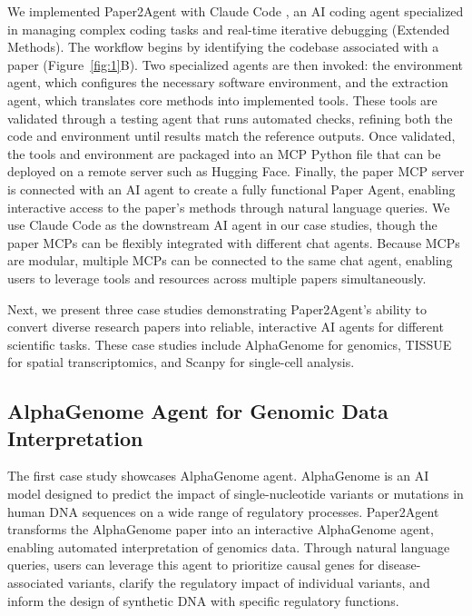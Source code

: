 \documentclass[11pt]{article}
\begin{document}
We implemented Paper2Agent with Claude Code \citep{anthropic_claude_code}, an AI coding agent specialized in managing complex coding tasks and real-time iterative debugging (Extended Methods). The workflow begins by identifying the codebase associated with a paper (Figure~\ref{fig:1}B). Two specialized agents are then invoked: the environment agent, which configures the necessary software environment, and the extraction agent, which translates core methods into implemented tools. These tools are validated through a testing agent that runs automated checks, refining both the code and environment until results match the reference outputs. Once validated, the tools and environment are packaged into an MCP Python file that can be deployed on a remote server such as Hugging Face. Finally, the paper MCP server is connected with an AI agent to create a fully functional Paper Agent, enabling interactive access to the paper’s methods through natural language queries. We use Claude Code as the downstream AI agent in our case studies, though the paper MCPs can be flexibly integrated with different chat agents. Because MCPs are modular, multiple MCPs can be connected to the same chat agent, enabling users to leverage tools and resources across multiple papers simultaneously.

Next, we present three case studies demonstrating Paper2Agent’s ability to convert diverse research papers into reliable, interactive AI agents for different scientific tasks. These case studies include AlphaGenome \citep{avsec2025alphagenome} for genomics, TISSUE \citep{sun2024tissue} for spatial transcriptomics, and Scanpy \citep{wolf2018scanpy} for single-cell analysis.


\subsection*{AlphaGenome Agent for Genomic Data Interpretation}
The first case study showcases AlphaGenome agent. AlphaGenome is an AI model designed to predict the impact of single-nucleotide variants or mutations in human DNA sequences on a wide range of regulatory processes. Paper2Agent transforms the AlphaGenome paper into an interactive AlphaGenome agent, enabling automated interpretation of genomics data. Through natural language queries, users can leverage this agent to prioritize causal genes for disease-associated variants, clarify the regulatory impact of individual variants, and inform the design of synthetic DNA with specific regulatory functions.
\end{document}
